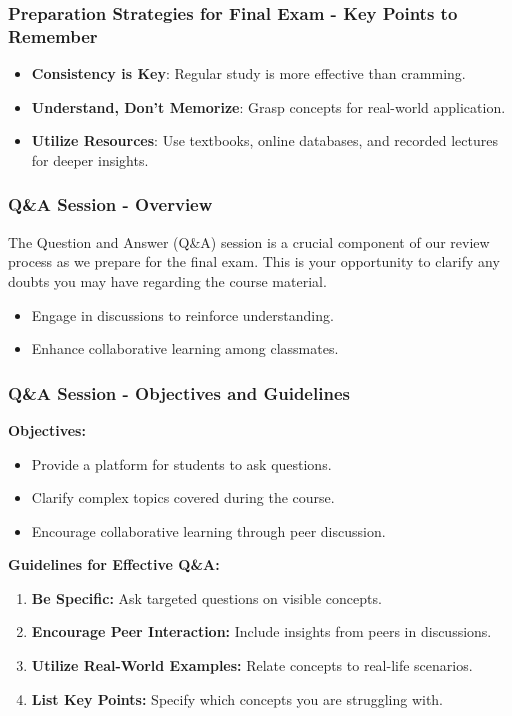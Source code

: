 \documentclass[aspectratio=169]{beamer}
\begin{document}
\begin{frame}[fragile]
    \frametitle{Preparation Strategies for Final Exam - Key Points to Remember}
    \begin{itemize}
        \item \textbf{Consistency is Key}: Regular study is more effective than cramming.
        \item \textbf{Understand, Don't Memorize}: Grasp concepts for real-world application.
        \item \textbf{Utilize Resources}: Use textbooks, online databases, and recorded lectures for deeper insights.
    \end{itemize}
\end{frame}

\begin{frame}[fragile]
    \frametitle{Q\&A Session - Overview}
    The Question and Answer (Q\&A) session is a crucial component of our review process as we prepare for the final exam. This is your opportunity to clarify any doubts you may have regarding the course material. 
    \begin{itemize}
        \item Engage in discussions to reinforce understanding.
        \item Enhance collaborative learning among classmates.
    \end{itemize}
\end{frame}

\begin{frame}[fragile]
    \frametitle{Q\&A Session - Objectives and Guidelines}
    \textbf{Objectives:}
    \begin{itemize}
        \item Provide a platform for students to ask questions.
        \item Clarify complex topics covered during the course.
        \item Encourage collaborative learning through peer discussion.
    \end{itemize}
    
    \textbf{Guidelines for Effective Q\&A:}
    \begin{enumerate}
        \item \textbf{Be Specific:} Ask targeted questions on visible concepts.
        \item \textbf{Encourage Peer Interaction:} Include insights from peers in discussions.
        \item \textbf{Utilize Real-World Examples:} Relate concepts to real-life scenarios.
        \item \textbf{List Key Points:} Specify which concepts you are struggling with.
    \end{enumerate}
\end{frame}
\end{document}
